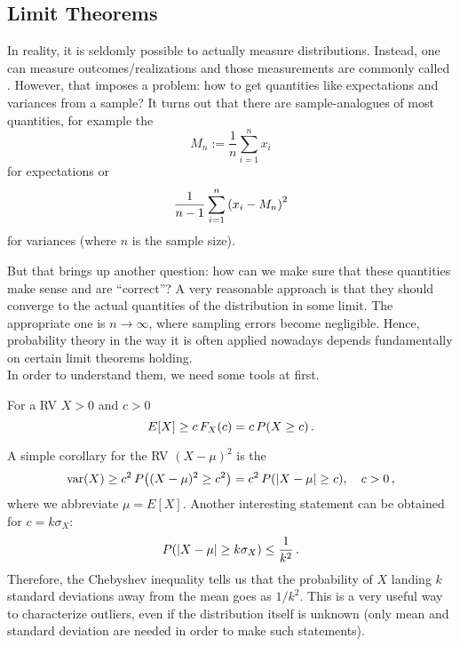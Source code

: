 	\subsection{Limit Theorems}\label{subsec:limit_thms}
In reality, it is seldomly possible to actually measure distributions. Instead, one can measure outcomes/realizations and those measurements are commonly called . However, that imposes a problem: how to get quantities like expectations and variances from a sample? It turns out that there are sample-analogues of most quantities, for example the 
\begin{equation}\label{eq:sample_mean}
M_n := \frac{1}{n} \sum_{i = 1}^n x_i
\end{equation}
for expectations or
\begin{equation}
\frac{1}{n - 1} \sum_{i = 1}^n \qty(x_i - M_n)^2
\end{equation}
for variances (where $n$ is the sample size).


But that brings up another question: how can we make sure that these quantities make sense and are \enquote{correct}? A very reasonable approach is that they should converge to the actual quantities of the distribution in some limit. The appropriate one is $n \rightarrow \infty$, where sampling errors become negligible. Hence, probability theory in the way it is often applied nowadays depends fundamentally on certain limit theorems holding.\\


In order to understand them, we need some tools at first.
\begin{prop}
For a RV $X > 0$ and $c > 0$
\begin{equation}
E[X] \geq c \, F_X(c) = c \, P\qty(X \geq c) \, .
\end{equation}
\end{prop}
A simple corollary for the RV $(X - \mu)^2$ is the 
\begin{equation}\label{eq:cor_markov}
\operatorname{var}(X) \geq c^2 \, P\qty((X - \mu)^2 \geq c^2) = c^2 \, P\qty(\abs{X - \mu} \geq c), \quad c > 0 \, ,
\end{equation}
where we abbreviate $\mu = E[X]$. Another interesting statement can be obtained for $c = k \sigma_X$:
\begin{equation}
P\qty(\abs{X - \mu} \geq k \sigma_X) \leq \frac{1}{k^2} \, .
\end{equation}
Therefore, the Chebyshev inequality tells us that the probability of $X$ landing $k$ standard deviations away from the mean goes as $1 / k^2$. This is a very useful way to characterize outliers, even if the distribution itself is unknown (only mean and standard deviation are needed in order to make such statements).\\


